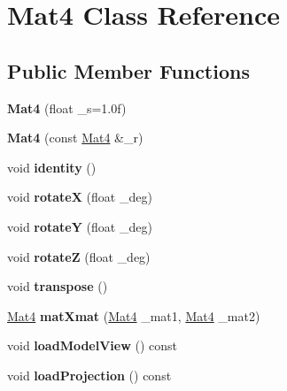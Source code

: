 \hypertarget{classMat4}{
\section{Mat4 Class Reference}
\label{classMat4}
}
\subsection*{Public Member Functions}
\begin{DoxyCompactItemize}
\item 
\hypertarget{classMat4_ae58e837dcd44249fadedacea016546be}{
{\bfseries Mat4} (float \_\-s=1.0f)}
\label{classMat4_ae58e837dcd44249fadedacea016546be}

\item 
\hypertarget{classMat4_a60d41e4464b7fea47fc333a1eabed96d}{
{\bfseries Mat4} (const \hyperlink{classMat4}{Mat4} \&\_\-r)}
\label{classMat4_a60d41e4464b7fea47fc333a1eabed96d}

\item 
\hypertarget{classMat4_ad4a8d1caecbfd18a61a9fe245e7463ab}{
void {\bfseries identity} ()}
\label{classMat4_ad4a8d1caecbfd18a61a9fe245e7463ab}

\item 
\hypertarget{classMat4_afc96b3d0d911d07988124657beca37fc}{
void {\bfseries rotateX} (float \_\-deg)}
\label{classMat4_afc96b3d0d911d07988124657beca37fc}

\item 
\hypertarget{classMat4_a00a1def220f8149c3034fad00d7fad6c}{
void {\bfseries rotateY} (float \_\-deg)}
\label{classMat4_a00a1def220f8149c3034fad00d7fad6c}

\item 
\hypertarget{classMat4_a91f70b0955b5465ca2c30efc7d80f400}{
void {\bfseries rotateZ} (float \_\-deg)}
\label{classMat4_a91f70b0955b5465ca2c30efc7d80f400}

\item 
\hypertarget{classMat4_af8b85ea76f3b7225ee33878029b1d18e}{
void {\bfseries transpose} ()}
\label{classMat4_af8b85ea76f3b7225ee33878029b1d18e}

\item 
\hypertarget{classMat4_ac76c8d051792b17a47379297f5ef6e34}{
\hyperlink{classMat4}{Mat4} {\bfseries matXmat} (\hyperlink{classMat4}{Mat4} \_\-mat1, \hyperlink{classMat4}{Mat4} \_\-mat2)}
\label{classMat4_ac76c8d051792b17a47379297f5ef6e34}

\item 
\hypertarget{classMat4_ab8a59432b5fa5ee98e336ce0b6aa1535}{
void {\bfseries loadModelView} () const }
\label{classMat4_ab8a59432b5fa5ee98e336ce0b6aa1535}

\item 
\hypertarget{classMat4_a421fdc614bb0b3e7346371aed1cf900c}{
void {\bfseries loadProjection} () const }
\label{classMat4_a421fdc614bb0b3e7346371aed1cf900c}

\end{DoxyCompactItemize}
